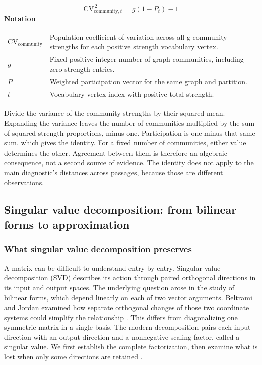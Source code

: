 \documentclass[10pt,letterpaper]{article}
\newcommand{\notlabel}{\noindent\textbf{Notation}\par\nobreak\vspace{4pt}}
\begin{document}
\par\noindent\begin{minipage}{\linewidth}
\begin{equation}\label{eq:communitycv}
\mathrm{CV}_{\mathrm{community},t}^{\,2}=g(1-P_t)-1
\end{equation}
\notlabel
{\fontsize{8.5}{10.5}\selectfont\setlength{\tabcolsep}{0pt}\renewcommand{\arraystretch}{1.12}
\begin{tabularx}{\linewidth}{@{}p{.14\linewidth}X@{}}
$\mathrm{CV}_{\mathrm{community}}$ & Population coefficient of variation across all g community strengths for each positive strength vocabulary vertex.\\
$g$ & Fixed positive integer number of graph communities, including zero strength entries.\\
$P$ & Weighted participation vector for the same graph and partition.\\
$t$ & Vocabulary vertex index with positive total strength.\\
\end{tabularx}}
\par\vspace{2pt}
\end{minipage}\par
Divide the variance of the community strengths by their squared mean. Expanding the variance leaves the number of communities multiplied by the sum of squared strength proportions, minus one. Participation is one minus that same sum, which gives the identity. For a fixed number of communities, either value determines the other. Agreement between them is therefore an algebraic consequence, not a second source of evidence. The identity does not apply to the main diagnostic's distances across passages, because those are different observations.\par

\subsection{Singular value decomposition: from bilinear forms to approximation}
\subsubsection{What singular value decomposition preserves}
A matrix can be difficult to understand entry by entry. Singular value decomposition (SVD) describes its action through paired orthogonal directions in its input and output spaces. The underlying question arose in the study of bilinear forms, which depend linearly on each of two vector arguments. Beltrami and Jordan examined how separate orthogonal changes of those two coordinate systems could simplify the relationship \cite{beltrami,jordan}. This differs from diagonalizing one symmetric matrix in a single basis. The modern decomposition pairs each input direction with an output direction and a nonnegative scaling factor, called a singular value. We first establish the complete factorization, then examine what is lost when only some directions are retained \cite{stewart}.\par
\end{document}
